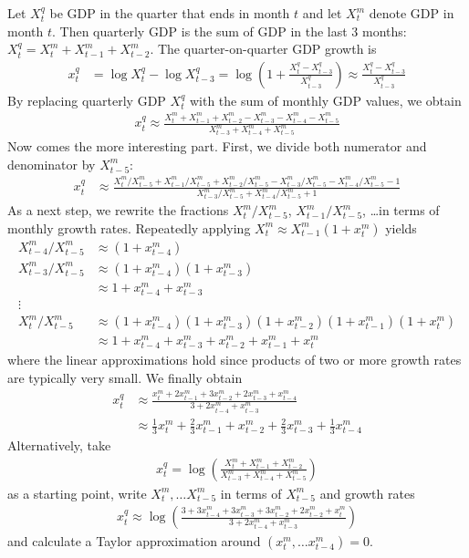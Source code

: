 \documentclass[12pt,a4paper]{scrartcl}
\begin{document}
Let $X^q_t$ be GDP in the quarter that ends in month $t$ and let $X^m_t$ denote GDP in month $t$. Then quarterly GDP is the sum of GDP in the last 3 months: $X^q_t = X^m_t + X^m_{t-1} + X^m_{t-2}$. The quarter-on-quarter GDP growth is
\begin{align}
x^q_t &= \log X^q_t - \log X^q_{t-3} 
= \log(1 + \frac{X^q_t-X^q_{t-3}}{X^q_{t-3}}) 
\approx \frac{X^q_t-X^q_{t-3}}{X^q_{t-3}}
\end{align}
By replacing quarterly GDP $X^q_t$ with the sum of monthly GDP values, we obtain
\begin{align}
x^q_t \approx \frac{X^m_t + X^m_{t-1} + X^m_{t-2} - X^m_{t-3} - X^m_{t-4} - X^m_{t-5}}{X^m_{t-3} + X^m_{t-4} + X^m_{t-5}}
\end{align}
Now comes the more interesting part. First, we divide both numerator and denominator by $X^m_{t-5}$:
\begin{align}
x^q_t &\approx \frac{X^m_t/X^m_{t-5} + X^m_{t-1}/X^m_{t-5} + X^m_{t-2}/X^m_{t-5} - X^m_{t-3}/X^m_{t-5} - X^m_{t-4}/X^m_{t-5} - 1}{X^m_{t-3}/X^m_{t-5} + X^m_{t-4}/X^m_{t-5} + 1}
\end{align}
As a next step, we rewrite the fractions $X_t^m/X_{t-5}^m$, $X_{t-1}^m/X_{t-5}^m$, \dots in terms of monthly growth rates. Repeatedly applying $X_t^m \approx X_{t-1}^m(1+x_{t}^m)$ yields
\begin{align}
X_{t-4}^m/X_{t-5}^m &\approx (1+x_{t-4}^m) \\
X_{t-3}^m/X_{t-5}^m &\approx (1+x_{t-4}^m)(1+x_{t-3}^m) \\
&\approx 1 + x_{t-4}^m + x_{t-3}^m \\
\vdots &  \\
X_t^m/X_{t-5}^m &\approx (1+x_{t-4}^m)(1+x_{t-3}^m)(1+x_{t-2}^m)(1+x_{t-1}^m)(1+x_t^m) \\
&\approx 1 + x_{t-4}^m + x_{t-3}^m + x_{t-2}^m + x_{t-1}^m + x_t^m
\end{align}
where the linear approximations hold since products of two or more growth rates are typically very small. We finally obtain
\begin{align}
x_t^q &\approx \frac{x_t^m + 2x_{t-1}^m + 3x_{t-2}^m + 2x_{t-3}^m + x_{t-4}^m}{3 + 2 x_{t-4}^m + x_{t-3}^m} \\
&\approx \frac{1}{3} x_t^m + \frac{2}{3} x_{t-1}^m + x_{t-2}^m + \frac{2}{3} x_{t-3}^m + \frac{1}{3} x_{t-4}^m
\end{align}
Alternatively, take 
\begin{align}
x^q_t = \log\left(\frac{X^m_t + X^m_{t-1} + X^m_{t-2}}{X^m_{t-3} + X^m_{t-4} + X^m_{t-5}}\right)
\end{align}
as a starting point, write $X^m_t, \dots X^m_{t-5}$ in terms of $X^m_{t-5}$ and growth rates 
\begin{align}
x^q_t \approx \log\left(\frac{3 + 3x^m_{t-4} + 3x^m_{t-3} + 3x^m_{t-2} + 2x^m_{t-2} +x^m_t}{3 + 2x^m_{t-4} + x^m_{t-3}}\right)
\end{align}
and calculate a Taylor approximation around $(x^m_t, \dots x^m_{t-4}) = 0$.\\
\end{document}
